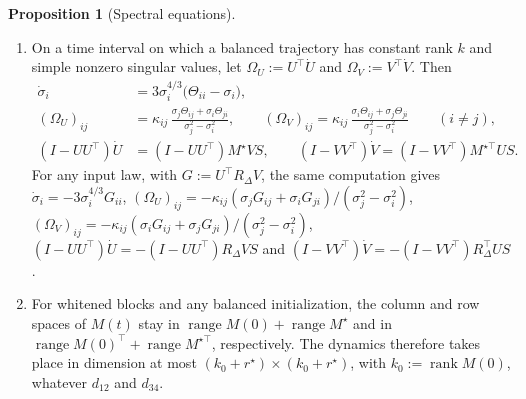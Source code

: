 \documentclass[11pt]{article}
\newcommand{\rank}{\operatorname{rank}}
\theoremstyle{definition}
\newtheorem{proposition}[theorem]{Proposition}
\numberwithin{equation}{section}
\begin{document}
\begin{proposition}[Spectral equations]\label{prop:na-spectral}
\leavevmode
\begin{enumerate}[label=(\alph*),nosep]
\item On a time interval on which a balanced trajectory has constant rank $k$ and simple nonzero singular values, let $\Omega_U:=U^\top\dot U$ and $\Omega_V:=V^\top\dot V$. Then
\begin{align}
\dot\sigma_i&=3\sigma_i^{4/3}\big(\Theta_{ii}-\sigma_i\big),\label{eq:na-sv}\\
(\Omega_U)_{ij}&=\kappa_{ij}\,\frac{\sigma_j\Theta_{ij}+\sigma_i\Theta_{ji}}{\sigma_j^2-\sigma_i^2},\qquad(\Omega_V)_{ij}=\kappa_{ij}\,\frac{\sigma_i\Theta_{ij}+\sigma_j\Theta_{ji}}{\sigma_j^2-\sigma_i^2}\qquad(i\neq j),\label{eq:na-rotation}\\
(I-UU^\top)\dot U&=(I-UU^\top)M^\star VS,\qquad(I-VV^\top)\dot V=(I-VV^\top)M^{\star\top}US.\label{eq:na-out}
\end{align}
For any input law, with $G:=U^\top R_\Delta V$, the same computation gives $\dot\sigma_i=-3\sigma_i^{4/3}G_{ii}$, $(\Omega_U)_{ij}=-\kappa_{ij}(\sigma_jG_{ij}+\sigma_iG_{ji})/(\sigma_j^2-\sigma_i^2)$, $(\Omega_V)_{ij}=-\kappa_{ij}(\sigma_iG_{ij}+\sigma_jG_{ji})/(\sigma_j^2-\sigma_i^2)$, $(I-UU^\top)\dot U=-(I-UU^\top)R_\Delta VS$ and $(I-VV^\top)\dot V=-(I-VV^\top)R_\Delta^\top US$.
\item For whitened blocks and any balanced initialization, the column and row spaces of $M(t)$ stay in $\operatorname{range}M(0)+\operatorname{range}M^\star$ and in $\operatorname{range}M(0)^\top+\operatorname{range}M^{\star\top}$, respectively. The dynamics therefore takes place in dimension at most $(k_0+r^\star)\times(k_0+r^\star)$, with $k_0:=\rank M(0)$, whatever $d_{12}$ and $d_{34}$.
\end{enumerate}
\end{proposition}
\end{document}
